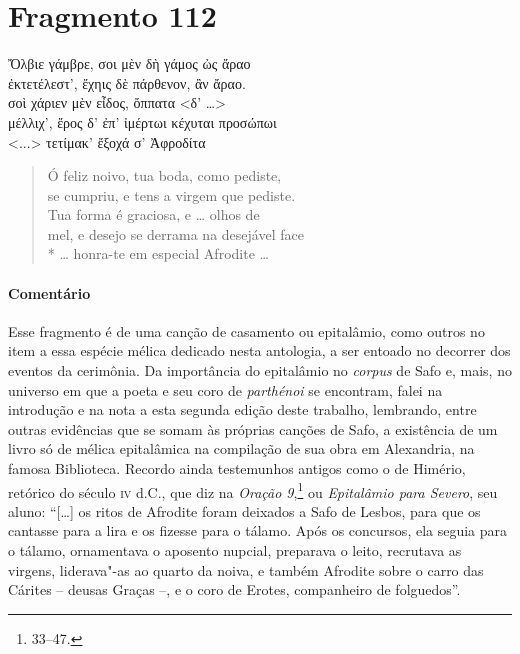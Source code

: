 \pagebreak

\section{Fragmento 112}

\begin{gkverse}
Ὄλβιε γάμβρε, σοι μὲν δὴ γάμος ὠς ἄραο\\
ἐκτετέλεστ’, ἔχηις δὲ πάρθενον, ἂν ἄραο.\\
σοὶ χάριεν μὲν εἶδος, ὄππατα <δ’ \ldots{}>\\
μέλλιχ’, ἔρος δ’ ἐπ’ ἰμέρτωι κέχυται προσώπωι\\
<...> τετίμακ’ ἔξοχά σ’ Ἀφροδίτα
\end{gkverse}

\begin{verse}
Ó feliz noivo, tua boda, como pediste,\\
se cumpriu, e tens a virgem que pediste.\\
Tua forma é graciosa, e \ldots{} olhos de\\
mel, e desejo se derrama na desejável face\\*
\ldots{} honra-te em especial Afrodite \ldots{}
\end{verse}

\medskip

\paragraph{Comentário} Esse fragmento é de uma canção de casamento ou epitalâmio, como outros no item a essa espécie mélica dedicado nesta antologia, a ser entoado no decorrer dos eventos da cerimônia.
Da importância do epitalâmio no \textit{corpus} de Safo e, mais, no universo em que a poeta e seu coro de \textit{parthénoi} se encontram, falei na introdução e na nota a esta segunda edição deste trabalho, lembrando, entre outras evidências que se somam às próprias canções de Safo, a existência de um livro só de mélica epitalâmica na compilação de sua obra  em Alexandria, na famosa Biblioteca. Recordo ainda testemunhos antigos como o de Himério, retórico do século \textsc{iv} d.C., que diz na \textit{Oração 9},\footnote{33--47.} ou \textit{Epitalâmio para Severo}, seu aluno: ``[\ldots{}] os ritos de Afrodite foram deixados a Safo de Lesbos, para que os cantasse para a lira e os fizesse para o tálamo. Após os concursos, ela seguia para o tálamo, ornamentava o aposento nupcial, preparava o leito, recrutava as virgens, liderava"-as ao quarto da noiva, e também Afrodite sobre o carro das Cárites -- deusas Graças --, e o coro de Erotes, companheiro de folguedos''.

